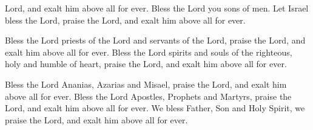 \documentclass{article}
\begin{document}
\begin{service}
\begin{multicols}{2}
{  Lord, and exalt him above all for ever. Bless the Lord you sons of men. Let
  Israel bless the Lord, praise the Lord, and exalt him above all for ever.  
  \item Bless the Lord priests of the Lord and servants of the Lord, praise
  the Lord, and exalt him above all for ever. Bless the Lord spirits and souls
  of the righteous, holy and humble of heart, praise the Lord, and exalt him 
  above all for ever.
  \item  Bless the Lord Ananias, Azarias and Misael, praise the Lord, and exalt
  him above all for ever. Bless the Lord Apostles, Prophets and Martyrs, praise
  the Lord, and exalt him above all for ever. We bless Father, Son and Holy
  Spirit, we praise the Lord, and exalt him above all for ever. 
}
\end{multicols}
\end{service}
\end{document}
